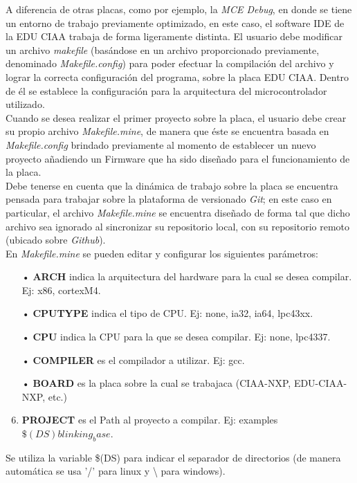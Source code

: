 \documentclass[12pt,letterpaper]{article}
\begin{document}
A diferencia de otras placas, como por ejemplo, la \textit{MCE Debug}, en donde se tiene un entorno de trabajo previamente optimizado, en este caso, el software IDE de la EDU CIAA trabaja de forma ligeramente distinta. El usuario debe modificar un archivo \textit{makefile} (basándose en un archivo proporcionado previamente, denominado \textit{Makefile.config}) para poder efectuar la compilación del archivo y lograr la correcta configuración del programa, sobre la placa EDU CIAA. Dentro de él se establece la configuración para la arquitectura del microcontrolador utilizado.
 \\
 
Cuando se desea realizar el primer proyecto sobre la placa, el usuario debe crear su propio archivo \textit{Makefile.mine}, de manera que éste se encuentra basada en \textit{Makefile.config} brindado previamente al momento de establecer un nuevo proyecto añadiendo un Firmware que ha sido diseñado para el funcionamiento de la placa.
 \\
 
Debe tenerse en cuenta que la dinámica de trabajo sobre la placa se encuentra pensada para trabajar sobre la plataforma de versionado \textit{Git}; en este caso en particular, el archivo \textit{Makefile.mine} se encuentra diseñado de forma tal que dicho archivo sea ignorado al sincronizar su repositorio local, con su repositorio remoto (ubicado sobre \textit{Github}).
 \\
 
En \textit{Makefile.mine} se pueden editar y configurar los siguientes parámetros\cite{parametrosdelmakefile}:
\begin{enumerate}
\item[•] \textbf{ARCH}  indica la arquitectura del hardware para la cual se desea compilar. Ej: x86, cortexM4.
\item[•] \textbf{CPUTYPE} indica el tipo de CPU. Ej: none, ia32, ia64, lpc43xx.
\item[•] \textbf{CPU} indica la CPU para la que se desea compilar. Ej: none, lpc4337.
\item[•] \textbf{COMPILER }es el compilador a utilizar. Ej: gcc.
\item[•] \textbf{BOARD }es la placa sobre la cual se trabajaca (CIAA-NXP, EDU-CIAA-NXP, etc.)
\item \textbf{PROJECT }es el Path al proyecto a compilar. Ej: examples$\$(DS)blinking_base$.
\end{enumerate}
Se utiliza la variable \$(DS) para indicar el separador de directorios (de manera automática se usa '/' para linux y \textbackslash{} para windows).
 \\
 
\end{document}
